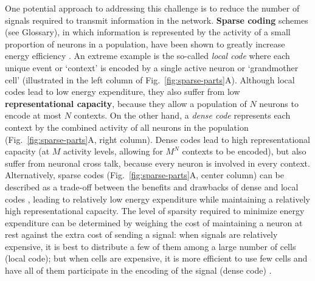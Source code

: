 One potential approach to addressing this challenge is to
reduce the number of signals required to transmit information in the network.
\textbf{Sparse coding} schemes (see Glossary),
in which information is represented by the activity of a small
proportion of neurons in a population,
have been shown to greatly increase energy efficiency 
\cite{Foldiak1990,Field1994,LevyBaxter1996}.
An extreme example is the so-called \emph{local code}
where each unique event or `context' is encoded by a single active neuron
or `grandmother cell' \cite{RollsTreves1990}
(illustrated in the left column of Fig.~\ref{fig:sparse-parts}A).
Although local codes lead to low energy expenditure, 
they also suffer from low \textbf{representational capacity},
because they allow a population of $N$ neurons to encode at most $N$ contexts.
On the other hand, a \emph{dense code}
represents each context by the combined activity
of all neurons in the population
(Fig.~\ref{fig:sparse-parts}A, right column).
Dense codes lead to high representational capacity
(at $M$ activity levels, allowing for $M^N$ contexts to be encoded),
but also suffer from neuronal cross talk,
because every neuron is involved in every context.
Alternatively, sparse codes
(Fig.~\ref{fig:sparse-parts}A, center column)
can be described as a trade-off between the benefits and
drawbacks of dense and local codes 
\cite{SpanneJorntell2015,Foldiak1990},
leading to relatively low energy expenditure while maintaining a 
relatively high representational capacity.
The level of sparsity required to minimize energy expenditure can be determined
by weighing the cost of maintaining a neuron at rest against the extra cost
of sending a signal:
when signals are relatively expensive, it is best to distribute a few of them
among a large number of cells (local code); but
when cells are expensive, it is more efficient to use few cells
and have all of them participate in the encoding of the signal (dense code)
\cite{RollsTreves1990,Laughlin2001}.


